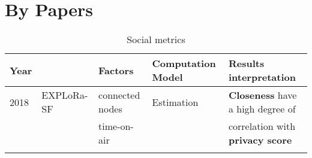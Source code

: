 \onecolumn
\section{By Papers}
\setlength{\hoffset}{-.5in}

\begin{longtable}{lllll}
	Year  & \                                              & \textbf{Factors}                 & \textbf{Computation Model}       & \textbf{Results interpretation}                               \\\hline
	2018  & EXPLoRa-SF \cite{cuomo_explora_2017}           & connected nodes            & Estimation                       & \textbf{Closeness} have a high degree of                      \\
	\     &                                                & time-on-air               &                                  & correlation with \textbf{privacy score}                       \\\hline

\caption{Social metrics}
\end{longtable}

\clearpage
\newpage
\setlength{\hoffset}{-0in}
\twocolumn
